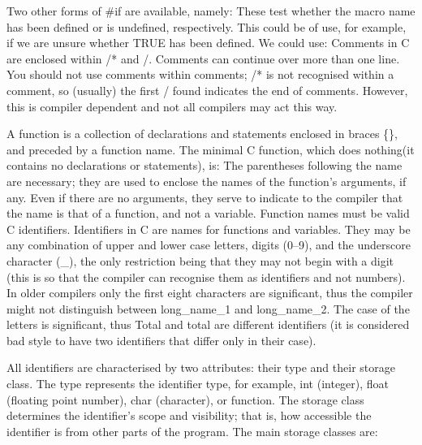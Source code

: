 Two other forms of {\cd \#if} are available, namely:
These test  whether the  macro name  has been  defined or  is 
undefined, respectively. This could be of use, for example, if we are
unsure whether {\cd TRUE} has been defined. We could use:
Comments in  C are  enclosed within  {\cd /*} and {\cd */}.  Comments
can continue over more than one line. You should not use comments within
comments; {\cd /*} is not recognised within a comment,
so (usually) the first {\cd */} found indicates the end of comments. 
However, this is compiler dependent and not all compilers may act
this way.


A function  is a  collection of  {\kc declarations\/} and  {\kc
statements\/} enclosed in braces {\cd \{\}}, and preceded by a {\kc
function name}. The minimal C function, which does
nothing(it contains no declarations or statements), is:
 The parentheses  following the  name are  necessary;  they  are  used
to enclose the  names of  the function's  arguments, if any. Even if
there are no arguments, they  serve to  indicate to the compiler that
the name is that of a function, and not a variable. Function names
must be valid C {\kc identifiers\/}.
     Identifiers in  C are  names for functions and variables. They
may be any combination  of  upper  and  lower  case letters, 
digits  (0--9),  and  the underscore character (\_), the only
restriction being that they may not begin with a  digit (this  is so
that the compiler can recognise them as identifiers and not numbers).
In older compilers only the first eight characters are significant, thus the
compiler  might not  distinguish between  {\cd long\_name\_1} and  
{\cd long\_name\_2}. The case of the letters is significant,  thus 
{\cd Total}  and  {\cd total}  are  different identifiers (it  is
considered  bad style  to have two identifiers that differ only in
their case).

     All identifiers are characterised by two attributes: their {\kc
type\/} and their {\kc storage class\/}.  The  type  represents the 
identifier type,  for  example,  {\cd int} (integer), {\cd float} 
(floating point  number), {\cd char} (character), or function. The
storage class  determines the  identifier's {\kc scope\/}  and {\kc
visibility\/}; that is, how accessible the identifier is from other
parts of the program. The main storage classes are:



